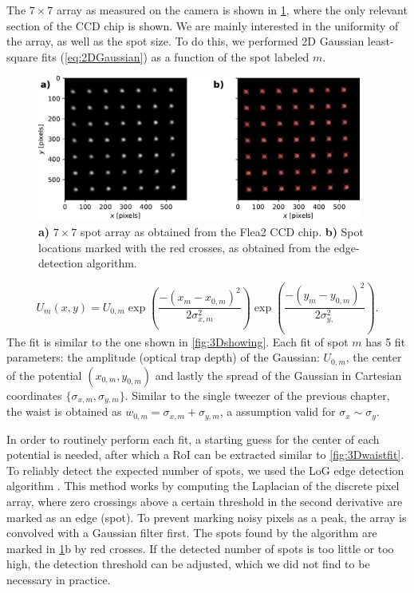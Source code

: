 The $7\times7$ array as measured on the camera is shown in \cref{fig:CameraLoG}, where the only relevant section of the CCD chip is shown. 
We are mainly interested in the uniformity of the array, as well as the spot size.
To do this, we performed 2D Gaussian least-square fits (\cref{eq:2DGaussian}) as a function of the spot labeled $m$.

\begin{figure}
    \centering
    \includegraphics[width=0.95\textwidth]{figures/CamImgLoGSpots.pdf}
    \caption{\textsf{\textbf{a)}} $7\times7$ spot array as obtained from the Flea2 CCD chip.
    \textsf{\textbf{b)}} Spot locations marked with the red crosses, as obtained from the edge-detection algorithm. }
    \label{fig:CameraLoG}
\end{figure}

\begin{equation}\label{eq:2DGaussianNumberK}
    U_m(x,y) = U_{0,m}\exp{\left(\frac{-(x_m-x_{0,m})^2}{2\sigma_{x,m}^2}\right)}
    \exp{\left( \frac{-(y_m-y_{0,m})^2}{2\sigma_{y,}^2} \right)}.
\end{equation}
The fit is similar to the one shown in \cref{fig:3Dshowing}.
Each fit of spot $m$ has 5 fit parameters: the amplitude (optical trap depth) of the Gaussian: $U_{0,m}$, the center of the potential $(x_{0,m}, y_{0,m})$ and lastly the spread of the Gaussian in Cartesian coordinates $\{\sigma_{x,m},\sigma_{y,m}\}$.
Similar to the single tweezer of the previous chapter, the waist is obtained as $w_{0,m} = \sigma_{x,m}+\sigma_{y,m}$, a assumption valid for $\sigma_x\sim\sigma_y$.

In order to routinely perform each fit, a starting guess for the center of each potential is needed, after which a \ac{RoI} can be extracted similar to \cref{fig:3Dwaistfit}.
To reliably detect the expected number of spots, we used the \ac{LoG} edge detection algorithm \cite{Haralick1992}. This method works by computing the Laplacian of the discrete pixel array, where zero crossings above a certain threshold in the second derivative are marked as an edge (spot). 
To prevent marking noisy pixels as a peak, the array is convolved with a Gaussian filter first. 
The spots found by the algorithm are marked in \ref{fig:CameraLoG}b by red crosses. 
If the detected number of spots is too little or too high, the detection threshold can be adjusted, which we did not find to be necessary in practice. 

